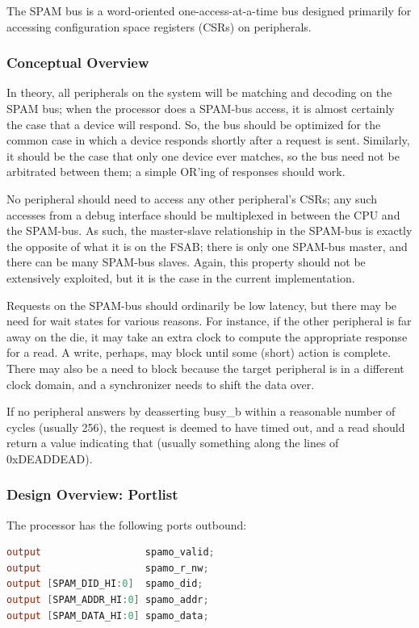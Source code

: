 \documentclass[10pt]{report}
\begin{document}
The SPAM bus is a word-oriented one-access-at-a-time bus designed primarily
for accessing configuration space registers (CSRs) on peripherals.

\subsubsection{Conceptual Overview}

In theory, all peripherals on the system will be matching and decoding on
the SPAM bus; when the processor does a SPAM-bus access, it is almost
certainly the case that a device will respond.  So, the bus should be
optimized for the common case in which a device responds shortly after a
request is sent.  Similarly, it should be the case that only one device ever
matches, so the bus need not be arbitrated between them; a simple OR'ing of
responses should work.

No peripheral should need to access any other peripheral's CSRs; any such
accesses from a debug interface should be multiplexed in between the CPU and
the SPAM-bus.  As such, the master-slave relationship in the SPAM-bus is
exactly the opposite of what it is on the FSAB; there is only one SPAM-bus
master, and there can be many SPAM-bus slaves.  Again, this property should
not be extensively exploited, but it is the case in the current
implementation.

Requests on the SPAM-bus should ordinarily be low latency, but there may be
need for wait states for various reasons.  For instance, if the other
peripheral is far away on the die, it may take an extra clock to compute the
appropriate response for a read.  A write, perhaps, may block until some
(short) action is complete.  There may also be a need to block because the
target peripheral is in a different clock domain, and a synchronizer needs
to shift the data over.

If no peripheral answers by deasserting busy\_b within a reasonable number
of cycles (usually 256), the request is deemed to have timed out, and a read
should return a value indicating that (usually something along the lines of
0xDEADDEAD).

\subsubsection{Design Overview: Portlist}

The processor has the following ports outbound:

\begin{lstlisting}[basicstyle=\footnotesize,language=Verilog]
output                  spamo_valid;
output                  spamo_r_nw;
output [SPAM_DID_HI:0]  spamo_did;
output [SPAM_ADDR_HI:0] spamo_addr;
output [SPAM_DATA_HI:0] spamo_data;
\end{lstlisting}
\end{document}
